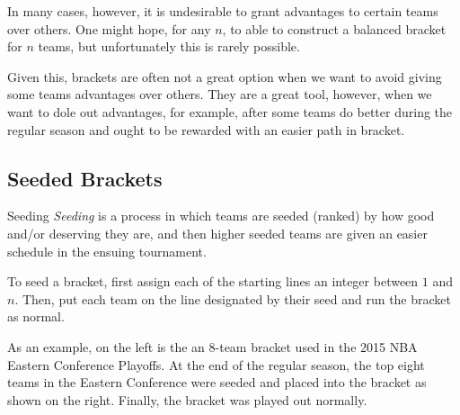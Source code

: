 \documentclass[../main.tex]{subfiles}
\begin{document}
In many cases, however, it is undesirable to grant advantages to certain teams over others. One might hope, for any $n$, to able to construct a balanced bracket for $n$ teams, but unfortunately this is rarely possible.


Given this, brackets are often not a great option when we want to avoid giving some teams advantages over others. They are a great tool, however, when we want to dole out advantages, for example, after some teams do better during the regular season and ought to be rewarded with an easier path in bracket.

\subsection{Seeded Brackets}
\begin{definition}{Seeding}{}
    \textit{Seeding} is a process in which teams are seeded (ranked) by how good and/or deserving they are, and then higher seeded teams are given an easier schedule in the ensuing tournament.
\end{definition}
To seed a bracket, first assign each of the starting lines an integer between $1$ and $n$. Then, put each team on the line designated by their seed and run the bracket as normal.

As an example, on the left is the an $8$-team bracket used in the 2015 NBA Eastern Conference Playoffs. At the end of the regular season, the top eight teams in the Eastern Conference were seeded and placed into the bracket as shown on the right. Finally, the bracket was played out normally.
\end{document}
